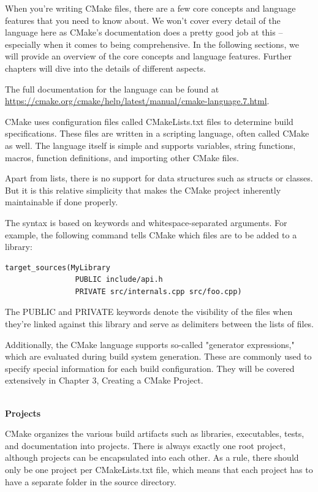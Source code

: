 
When you're writing CMake files, there are a few core concepts and language features that you need to know about. We won't cover every detail of the language here as CMake's documentation does a pretty good job at this – especially when it comes to being comprehensive. In the following sections, we will provide an overview of the core concepts and language features. Further chapters will dive into the details of different aspects.

The full documentation for the language can be found at \url{https://cmake.org/cmake/help/latest/manual/cmake-language.7.html}.


CMake uses configuration files called CMakeLists.txt files to determine build specifications. These files are written in a scripting language, often called CMake as well. The language itself is simple and supports variables, string functions, macros, function definitions, and importing other CMake files.

Apart from lists, there is no support for data structures such as structs or classes. But it is this relative simplicity that makes the CMake project inherently maintainable if done properly.

The syntax is based on keywords and whitespace-separated arguments. For example, the following command tells CMake which files are to be added to a library:

\begin{lstlisting}[style=styleCMake]
target_sources(MyLibrary
                PUBLIC include/api.h
                PRIVATE src/internals.cpp src/foo.cpp)
\end{lstlisting}

The PUBLIC and PRIVATE keywords denote the visibility of the files when they're linked against this library and serve as delimiters between the lists of files.

Additionally, the CMake language supports so-called "generator expressions," which are evaluated during build system generation. These are commonly used to specify special information for each build configuration. They will be covered extensively in Chapter 3, Creating a CMake Project.

\hspace*{\fill} \\ %
\noindent
\textbf{Projects}

CMake organizes the various build artifacts such as libraries, executables, tests, and documentation into projects. There is always exactly one root project, although projects can be encapsulated into each other. As a rule, there should only be one project per CMakeLists.txt file, which means that each project has to have a separate folder in the source directory.


